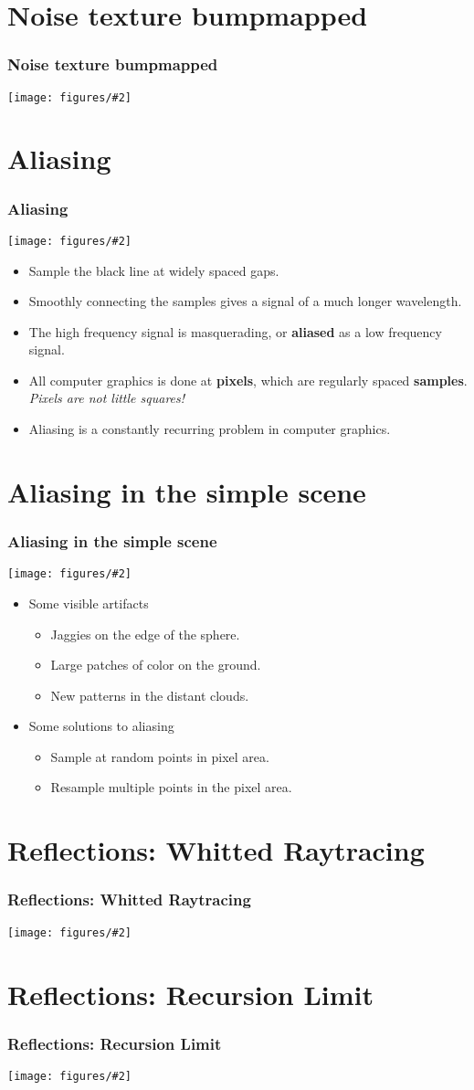 \documentclass[slidestop,xcolor=pst]{beamer}
\newcommand{\mygraphc}[2]{\centerline{\texttt{[image: figures/\#2]}}}
\newcommand{\sect}[1]{
\section{#1}
\begin{frame}[fragile]\frametitle{#1}
}
\begin{document}
\sect{Noise texture bumpmapped}
\mygraphc{0.85}{bumpnoise.png}
\end{frame}

\sect{Aliasing}
\mygraphc{.7}{aliasingplot.png}

\begin{itemize}
\item Sample the black line at widely spaced gaps.

\item Smoothly connecting the samples gives a signal of a much longer
  wavelength. 
\item The high frequency signal is masquerading, or {\bf aliased} as a
  low frequency signal.
\item All computer graphics is done at {\bf pixels}, which are
  regularly spaced {\bf samples}.  {\em Pixels are not little squares!}
\item Aliasing is a constantly recurring problem in computer graphics.

\end{itemize}

\end{frame}

\sect{Aliasing in the simple scene}
\mygraphc{.5}{simplescene.png}

\begin{itemize}
\item Some visible artifacts
\begin{itemize}
\item Jaggies on the edge of the sphere.
\item Large patches of color on the ground.
\item New patterns in the distant clouds.
\end{itemize}

\item {Some solutions to aliasing}
\begin{itemize}
\item Sample at random points in pixel area.
\item Resample multiple points in the pixel area.
\end{itemize}
\end{itemize}
\end{frame}

\sect{Reflections:  Whitted Raytracing}
\mygraphc{0.8}{reflectionscene.png}
\end{frame}

\sect{Reflections: Recursion Limit}
\mygraphc{0.8}{reflection00.png}
\end{frame}
\end{document}
